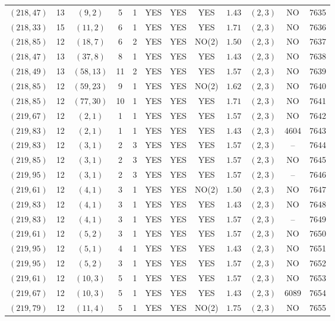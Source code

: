 \begin{longtable}{|c|c|c|c|c|c|c|c|c|c|c|c|}
$(218,47)$ & 13 & $(9,2)$ & 5 & 1 & YES & YES & YES & $1.43$ & $(2,3)$ & NO & 7635\\
$(218,33)$ & 15 & $(11,2)$ & 6 & 1 & YES & YES & YES & $1.71$ & $(2,3)$ & NO & 7636\\
$(218,85)$ & 12 & $(18,7)$ & 6 & 2 & YES & YES & NO(2) & $1.50$ & $(2,3)$ & NO & 7637\\
$(218,47)$ & 13 & $(37,8)$ & 8 & 1 & YES & YES & YES & $1.43$ & $(2,3)$ & NO & 7638\\
$(218,49)$ & 13 & $(58,13)$ & 11 & 2 & YES & YES & YES & $1.57$ & $(2,3)$ & NO & 7639\\
$(218,85)$ & 12 & $(59,23)$ & 9 & 1 & YES & YES & NO(2) & $1.62$ & $(2,3)$ & NO & 7640\\
$(218,85)$ & 12 & $(77,30)$ & 10 & 1 & YES & YES & YES & $1.71$ & $(2,3)$ & NO & 7641\\
$(219,67)$ & 12 & $(2,1)$ & 1 & 1 & YES & YES & YES & $1.57$ & $(2,3)$ & NO & 7642\\
$(219,83)$ & 12 & $(2,1)$ & 1 & 1 & YES & YES & YES & $1.43$ & $(2,3)$ & 4604 & 7643\\
$(219,83)$ & 12 & $(3,1)$ & 2 & 3 & YES & YES & YES & $1.57$ & $(2,3)$ & -- & 7644\\
$(219,85)$ & 12 & $(3,1)$ & 2 & 3 & YES & YES & YES & $1.57$ & $(2,3)$ & NO & 7645\\
$(219,95)$ & 12 & $(3,1)$ & 2 & 3 & YES & YES & YES & $1.57$ & $(2,3)$ & -- & 7646\\
$(219,61)$ & 12 & $(4,1)$ & 3 & 1 & YES & YES & NO(2) & $1.50$ & $(2,3)$ & NO & 7647\\
$(219,83)$ & 12 & $(4,1)$ & 3 & 1 & YES & YES & YES & $1.43$ & $(2,3)$ & NO & 7648\\
$(219,83)$ & 12 & $(4,1)$ & 3 & 1 & YES & YES & YES & $1.57$ & $(2,3)$ & -- & 7649\\
$(219,61)$ & 12 & $(5,2)$ & 3 & 1 & YES & YES & YES & $1.57$ & $(2,3)$ & NO & 7650\\
$(219,95)$ & 12 & $(5,1)$ & 4 & 1 & YES & YES & YES & $1.43$ & $(2,3)$ & NO & 7651\\
$(219,95)$ & 12 & $(5,2)$ & 3 & 1 & YES & YES & YES & $1.57$ & $(2,3)$ & NO & 7652\\
$(219,61)$ & 12 & $(10,3)$ & 5 & 1 & YES & YES & YES & $1.57$ & $(2,3)$ & NO & 7653\\
$(219,67)$ & 12 & $(10,3)$ & 5 & 1 & YES & YES & YES & $1.43$ & $(2,3)$ & 6089 & 7654\\
$(219,79)$ & 12 & $(11,4)$ & 5 & 1 & YES & YES & NO(2) & $1.75$ & $(2,3)$ & NO & 7655\\

\end{longtable}
